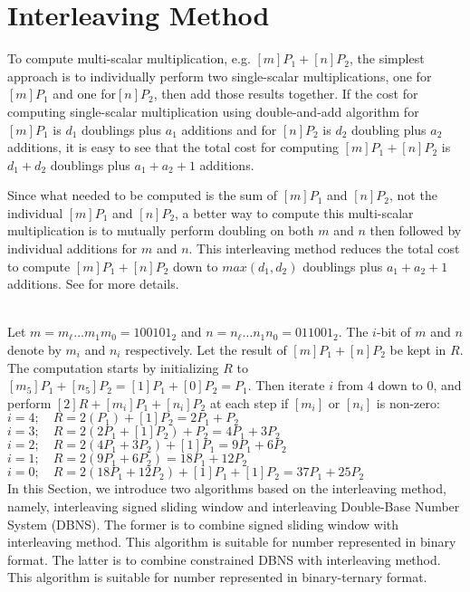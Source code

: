 \section{Interleaving Method}
To compute multi-scalar multiplication, e.g. $[m]P_1+[n]P_2$,
the simplest approach is to individually perform two single-scalar multiplications,
one for $[m]P_1$ and one for$[n]P_2$, then add those results together.
If the cost for computing single-scalar multiplication using double-and-add algorithm
for $[m]P_1$ is $d_1$ doublings plus $a_1$ additions and for $[n]P_2$ is $d_2$ doubling plus $a_2$ additions,
it is easy to see that the total cost for computing $[m]P_1 + [n]P_2$ is $d_1 + d_2$ doublings plus $a_1 + a_2 + 1$ additions.

Since what needed to be computed is the sum of $[m]P_1$ and $[n]P_2$, not the individual $[m]P_1$ and $[n]P_2$,
a better way to compute this multi-scalar multiplication is to mutually perform doubling on both $m$ and $n$
then followed by individual additions for $m$ and $n$.
This interleaving method reduces the total cost to compute $[m]P_1 + [n]P_2$ down to
$max(d_1,d_2)$ doublings plus $a_1 + a_2 + 1$ additions.
See \cite{DI08} for more details.

 \\
Let $m = m_\ell \dots m_1 m_0 = {100101}_2$ and $n = n_\ell \dots n_1 n_0 = {011001}_2$.
The $i$-bit of $m$ and $n$ denote by $m_i$ and $n_i$ respectively.
Let the result of $[m]P_1 + [n]P_2$ be kept in $R$.
The computation starts by initializing $R$ to $[m_5]P_1 + [n_5]P_2 = [1]P_1 + [0]P_2 = P_1$.
Then iterate $i$ from $4$ down to $0$, and perform $[2]R + [m_i]P_1 + [n_i]P_2$ at each step if $[m_i]$ or $[n_i]$ is non-zero: \\
$i=4; \quad R = 2(P_1) + [1]P_2 = 2P_1 + P_2$ \\
$i=3; \quad R = 2(2P_1 + [1]P_2) + P_2 = 4P_1 + 3P_2$ \\
$i=2; \quad R = 2(4P_1 + 3P_2) + [1]P_1 = 9P_1 + 6P_2$ \\
$i=1; \quad R = 2(9P_1 + 6P_2) = 18P_1 + 12P_2$ \\
$i=0; \quad R = 2(18P_1 + 12P_2) + [1]P_1 + [1]P_2 = 37P_1 + 25P_2$ \\

In this Section, we introduce two algorithms based on the interleaving method,
namely, interleaving signed sliding window and interleaving Double-Base Number System (DBNS).
The former is to combine signed sliding window with interleaving method.
This algorithm is suitable for number represented in binary format.
The latter is to combine constrained DBNS with interleaving method.
This algorithm is suitable for number represented in binary-ternary format.



